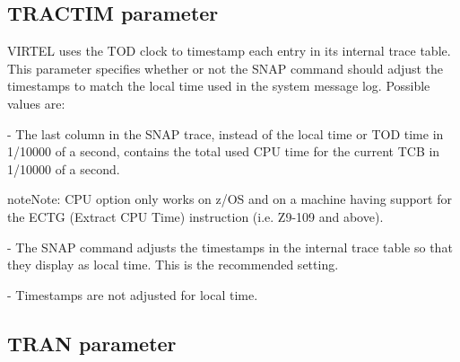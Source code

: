 \documentclass[letterpaper,10pt,english]{sphinxmanual}
\begin{document}

\subsection{TRACTIM parameter}
\label{\detokenize{Installation_Guide:tractim-parameter}}\label{\detokenize{Installation_Guide:index-131}}
\begin{sphinxVerbatim}[commandchars=\\\{\}]
 
\end{sphinxVerbatim}

VIRTEL uses the TOD clock to timestamp each entry in its internal trace table. This parameter specifies whether or not the SNAP command should adjust the timestamps to match the local time used in the system message log. Possible values are:

 - The last column in the SNAP trace, instead of the local time or TOD time in 1/10000 of a second, contains the total used CPU time for the current TCB in 1/10000 of a second.

\begin{sphinxadmonition}{note}{Note:}
CPU option only works on z/OS and on a machine having support for the ECTG (Extract CPU Time) instruction (i.e. Z9-109 and above).
\end{sphinxadmonition}

 - The SNAP command adjusts the timestamps in the internal trace table so that they display as local time. This is the recommended setting.

 - Timestamps are not adjusted for local time.


\subsection{TRAN parameter}
\label{\detokenize{Installation_Guide:tran-parameter}}\label{\detokenize{Installation_Guide:index-132}}
\begin{sphinxVerbatim}[commandchars=\\\{\}]
 
\end{sphinxVerbatim}
\end{document}
